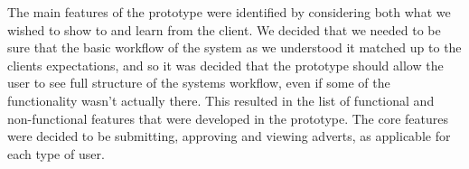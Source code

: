 The main features of the prototype were identified by considering both what we wished to show to
and learn from the client. We decided that we needed to be sure that the basic workflow of the system 
as we understood it matched up to the clients expectations, and so it was decided that the prototype should
allow the user to see full structure of the systems workflow, even if some of the functionality wasn't actually 
there. This resulted in the list of functional and non-functional features that were developed in the prototype.
The core features were decided to be submitting, approving and viewing adverts, as applicable for each type
of user.